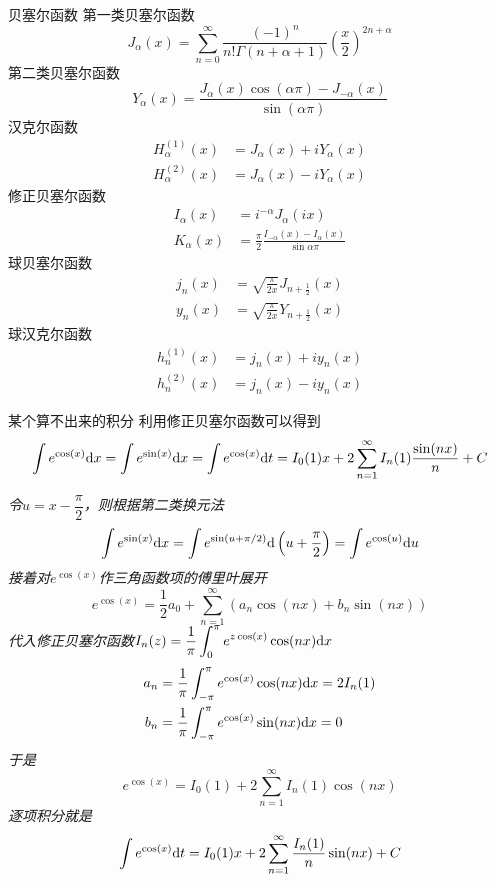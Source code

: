 \documentclass[main.tex]{subfiles}
\begin{document}
\begin{definition}{贝塞尔函数}
    第一类贝塞尔函数
    \[J_{\alpha}(x) = \sum_{n=0}^{\infty} \frac{(-1)^{n}}{n!\Gamma (n+\alpha +1)}{\left({\frac {x}{2}}\right)}^{2n+\alpha}\]
    第二类贝塞尔函数
    \[Y_{\alpha}(x) = \frac{J_{\alpha}(x)\cos(\alpha\pi)-J_{-\alpha}(x)}{\sin(\alpha\pi)}\]
    汉克尔函数
    \[
        \begin{aligned}
            H_{\alpha }^{(1)}(x) &= J_{\alpha }(x)+iY_{\alpha }(x) \\ 
            H_{\alpha}^{(2)}(x) &= J_{\alpha}(x)-iY_{\alpha}(x) 
        \end{aligned}
    \]
    修正贝塞尔函数
    \[
        \begin{aligned}
            I_{\alpha }(x) &= i^{-\alpha }J_{\alpha }(ix) \\
            K_{\alpha }(x) &= \frac {\pi }{2}{\frac {I_{-\alpha }(x)-I_{\alpha }(x)}{\sin \alpha \pi }} 
        \end{aligned}
    \]
    球贝塞尔函数
    \[
        \begin{aligned}
            j_{n}(x) &= \sqrt{\frac {\pi }{2x}}J_{n+{\frac {1}{2}}}(x) \\
            y_{n}(x) &= \sqrt{\frac {\pi }{2x}}Y_{n+{\frac {1}{2}}}(x)
        \end{aligned}
    \]
    球汉克尔函数
    \[
        \begin{aligned}
            h_{n}^{(1)}(x) &= j_{n}(x)+iy_{n}(x) \\
            h_{n}^{(2)}(x) &= j_{n}(x)-iy_{n}(x)
        \end{aligned}
    \]
\end{definition}

\begin{proposition}{某个算不出来的积分}
    利用修正贝塞尔函数可以得到
    \[\int e^{\cos(x)}{\rm d}x = \int e^{\sin(x)}{\rm d}x = \int e^{\cos(x)}{\rm d}t=I_0(1)x+2\sum_{n=1}^{\infty}I_n(1)\frac{\sin(nx)}{n} + C\]
\end{proposition}

\textit{
    令\(u=x-\dfrac{\pi}{2}\)，则根据第二类换元法
    \[\int e^{\sin(x)}{\rm d}x = \int e^{\sin(u+\pi/2)}{\rm d}\left(u+\frac{\pi}{2}\right)=\int e^{\cos(u)}{\rm d}u\]
    接着对\(e^{\cos(x)}\)作三角函数项的傅里叶展开
    \[e^{\cos(x)}=\frac{1}{2}a_0+\sum_{n=1}^{\infty}\left(a_n\cos(nx)+b_n\sin(nx)\right)\]
    代入修正贝塞尔函数\(\displaystyle{I_n(z)=\frac{1}{\pi}\int_{0}^{\pi}e^{z\cos(x)}\cos(nx){\rm d}x}\)
    \[
        \begin{aligned}
            a_n&=\frac{1}{\pi}\int_{-\pi}^{\pi}e^{\cos(x)}\cos(nx){\rm d}x=2I_n(1) \\
            b_n&=\frac{1}{\pi}\int_{-\pi}^{\pi}e^{\cos(x)}\sin(nx){\rm d}x=0
        \end{aligned}
    \]
    于是
    \[e^{\cos(x)}=I_0(1)+2\sum_{n=1}^{\infty}I_n(1)\cos(nx)\]
    逐项积分就是
    \[\int e^{\cos(x)}{\rm d}t=I_0(1)x+2\sum_{n=1}^{\infty}\frac{I_n(1)}{n}\sin(nx) + C\]
}
\end{document}
